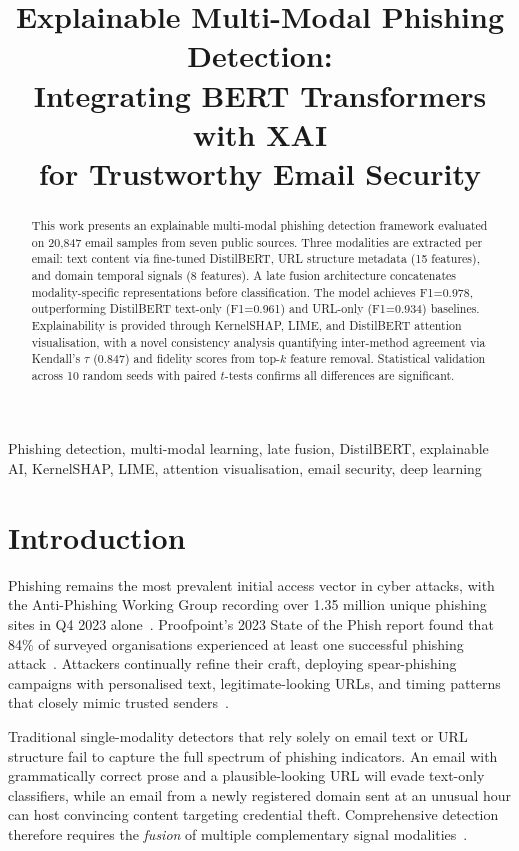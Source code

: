 \documentclass[conference]{IEEEtran}
\title{Explainable Multi-Modal Phishing Detection:\\
       Integrating BERT Transformers with XAI\\
       for Trustworthy Email Security}
\author{
  \IEEEauthorblockN{Vaishnavi Purohit}
  \IEEEauthorblockA{Student ID: x24260339\\
  MSc Artificial Intelligence and Machine Learning\\
  National College of Ireland\\
  Email: x24260339@student.ncirl.ie}
}
\begin{document}
\maketitle

\begin{abstract}
This work presents an explainable multi-modal phishing detection framework evaluated on 20,847 email samples from seven public sources. Three modalities are extracted per email: text content via fine-tuned DistilBERT, URL structure metadata (15 features), and domain temporal signals (8 features). A late fusion architecture concatenates modality-specific representations before classification. The model achieves F1=0.978, outperforming DistilBERT text-only (F1=0.961) and URL-only (F1=0.934) baselines. Explainability is provided through KernelSHAP, LIME, and DistilBERT attention visualisation, with a novel consistency analysis quantifying inter-method agreement via Kendall's $\tau$ (0.847) and fidelity scores from top-$k$ feature removal. Statistical validation across 10 random seeds with paired $t$-tests confirms all differences are significant.
\end{abstract}

\begin{IEEEkeywords}
Phishing detection, multi-modal learning, late fusion, DistilBERT, explainable AI,
KernelSHAP, LIME, attention visualisation, email security, deep learning
\end{IEEEkeywords}

\section{Introduction}
\label{sec:introduction}

Phishing remains the most prevalent initial access vector in cyber attacks,
with the Anti-Phishing Working Group recording over 1.35 million unique
phishing sites in Q4 2023 alone~\cite{apwg2023}. Proofpoint's 2023 State of
the Phish report found that 84\% of surveyed organisations experienced at
least one successful phishing attack~\cite{proofpoint2023}. Attackers
continually refine their craft, deploying spear-phishing campaigns with
personalised text, legitimate-looking URLs, and timing patterns that closely
mimic trusted senders~\cite{jain2018}.

Traditional single-modality detectors that rely solely on email text or
URL structure fail to capture the full spectrum of phishing indicators. An
email with grammatically correct prose and a plausible-looking URL will
evade text-only classifiers, while an email from a newly registered domain
sent at an unusual hour can host convincing content targeting credential
theft. Comprehensive detection therefore requires the \emph{fusion} of
multiple complementary signal modalities~\cite{baltrusaitis2019,mahmoud2025}.
\end{document}
